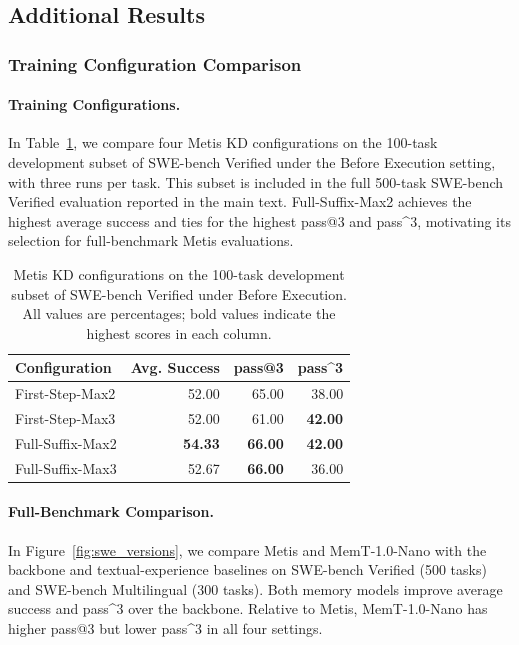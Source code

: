 \subsection{Additional Results}
\subsubsection{Training Configuration Comparison}

\paragraph{Training Configurations.}
In Table~\ref{tab:v1_training_configurations}, we compare four Metis KD configurations
on the 100-task development subset of SWE-bench Verified under the Before Execution setting, with three runs per task. This subset is included in the full 500-task SWE-bench Verified evaluation reported in the main text.
Full-Suffix-Max2 achieves the highest average success and ties for the
highest pass@3 and pass\textasciicircum{}3, motivating its selection for full-benchmark
Metis evaluations. 

\begin{table}[tb]
  \centering
  \small
  \caption{Metis KD configurations on the 100-task development subset of SWE-bench Verified under Before Execution.
  All values are percentages; bold values indicate the highest scores in each column.}
  \label{tab:v1_training_configurations}
  \begin{tabular}{lrrr}
    \toprule
    Configuration & Avg. Success & pass@3 & pass\textasciicircum{}3 \\
    \midrule
    First-Step-Max2  & 52.00 & 65.00 & 38.00 \\
    First-Step-Max3  & 52.00 & 61.00 & \textbf{42.00} \\
    Full-Suffix-Max2 & \textbf{54.33} & \textbf{66.00} & \textbf{42.00} \\
    Full-Suffix-Max3 & 52.67 & \textbf{66.00} & 36.00 \\
    \bottomrule
  \end{tabular}
\end{table}

\paragraph{Full-Benchmark Comparison.}
In Figure~\ref{fig:swe_versions}, we compare Metis and MemT-1.0-Nano with the backbone and textual-experience baselines on SWE-bench Verified (500 tasks) and SWE-bench Multilingual (300 tasks). Both memory models improve average success and pass\textasciicircum{}3 over the backbone. Relative to Metis, MemT-1.0-Nano has higher pass@3 but lower pass\textasciicircum{}3 in all four settings. 

